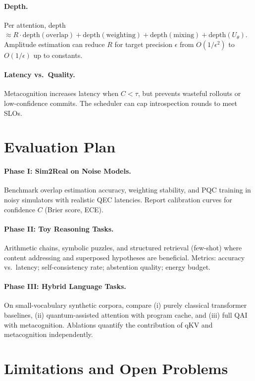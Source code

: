\documentclass[11pt]{article}
\begin{document}
\paragraph{Depth.}
Per attention, depth $\approx R\cdot \mathrm{depth}(\text{overlap}) + \mathrm{depth}(\text{weighting}) + \mathrm{depth}(\text{mixing}) + \mathrm{depth}(U_\theta)$.
Amplitude estimation can reduce $R$ for target precision $\epsilon$ from $O(1/\epsilon^2)$ to $O(1/\epsilon)$ up to constants.

\paragraph{Latency vs.\ Quality.}
Metacognition increases latency when $C<\tau$, but prevents wasteful rollouts or low-confidence commits.
The scheduler can cap introspection rounds to meet SLOs.

\section{Evaluation Plan}

\paragraph{Phase I: Sim2Real on Noise Models.}
Benchmark overlap estimation accuracy, weighting stability, and PQC training in noisy simulators with realistic QEC latencies.
Report calibration curves for confidence $C$ (Brier score, ECE).

\paragraph{Phase II: Toy Reasoning Tasks.}
Arithmetic chains, symbolic puzzles, and structured retrieval (few-shot) where content addressing and superposed hypotheses are beneficial.
Metrics: accuracy vs.\ latency; self-consistency rate; abstention quality; energy budget.

\paragraph{Phase III: Hybrid Language Tasks.}
On small-vocabulary synthetic corpora, compare (i) purely classical transformer baselines, (ii) quantum-assisted attention with program cache, and (iii) full QAI with metacognition.
Ablations quantify the contribution of qKV and metacognition independently.

\section{Limitations and Open Problems}
\end{document}
